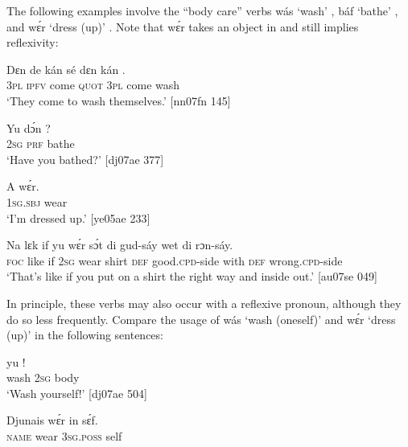 The following examples involve the “body care” verbs wás ‘wash’ , báf ‘bathe’ , and wɛ́r ‘dress (up)’ . Note that wɛ́r takes an object in  and still implies reflexivity:



\ea%
    \label{ex:key:1297}
    \gll Dɛn  de  kán    sé    dɛn  kán    .\\
\textsc{3pl}  \textsc{ipfv}  come  \textsc{quot}    \textsc{3pl}  come  wash\\

\glt ‘They come to wash themselves.’ [nn07fn 145]
\z


\ea%
    \label{ex:key:1298}
    \gll Yu  dɔ́n  ?\\
\textsc{2sg}  \textsc{prf}  bathe\\

\glt ‘Have you bathed?’ [dj07ae 377]
\z


\ea%
    \label{ex:key:1299}
    \gll A    wɛ́r.\\
\textsc{1sg.sbj}  wear\\

\glt ‘I’m dressed up.’ [ye05ae 233]
\z


\ea%
    \label{ex:key:1300}
    \gll Na  lɛk  if  yu  wɛ́r    sɔ́t    di  gud-sáy
wet    di  rɔn-sáy.\\
\textsc{foc}  like  if  \textsc{2sg}  wear  shirt  \textsc{def}  good\textsc{.cpd}{}-side
with    \textsc{def}  wrong\textsc{.cpd}{}-side\\

\glt ‘That’s like if you put on a shirt the right way and inside out.’ [au07se 049]
\z

In principle, these verbs may also occur with a reflexive pronoun, although they do so less frequently. Compare the usage of wás ‘wash (oneself)’ and wɛ́r ‘dress (up)’ in the following sentences: 


\ea%
    \label{ex:key:1301}
    \gll {}    yu  !\\
wash  \textsc{2sg}  body\\

\glt ‘Wash yourself!’ [dj07ae 504]
\z


\ea%
    \label{ex:key:1302}
    \gll Djunais  wɛ́r    in    sɛ́f.\\
\textsc{name}  wear  \textsc{3sg.poss}  self\\

